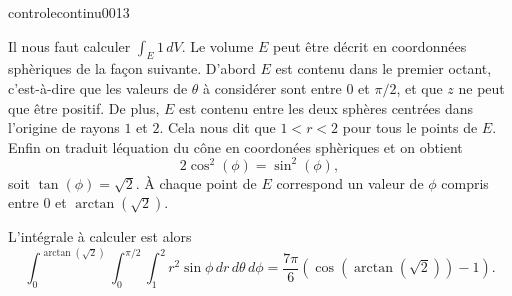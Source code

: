 \begin{corrige}{controlecontinu0013}

	Il nous faut calculer $\int_{E}1\,dV$. Le volume $E$ peut être décrit en coordonnées sphèriques de la façon suivante. D'abord $E$ est contenu dans le premier octant, c'est-à-dire que les valeurs de $\theta$ à considérer sont entre $0$ et $\pi/2$, et que $z$ ne peut que être positif. De plus, $E$ est contenu entre les deux sphères centrées dans l'origine de rayons $1$ et $2$. Cela nous dit que $1<r<2$ pour tous le points de $E$. Enfin on traduit léquation du cône en coordonées sphèriques et on obtient
	\[
		2\cos^2(\phi)= \sin^2(\phi),
	\]
	soit $\tan(\phi)=\sqrt{2}$. À chaque point de $E$ correspond un valeur de $\phi$ compris entre $0$ et $\arctan(\sqrt{2})$.

	L'intégrale à calculer est alors
	\[
		\int_0^{\arctan(\sqrt{2})}\int_0^{\pi/2}\int_{1}^{2} r^2\sin{\phi}\, dr\, d\theta\, d\phi = \frac{7\pi}{6}(\cos(\arctan(\sqrt{2}))-1).
	\]

\end{corrige}
